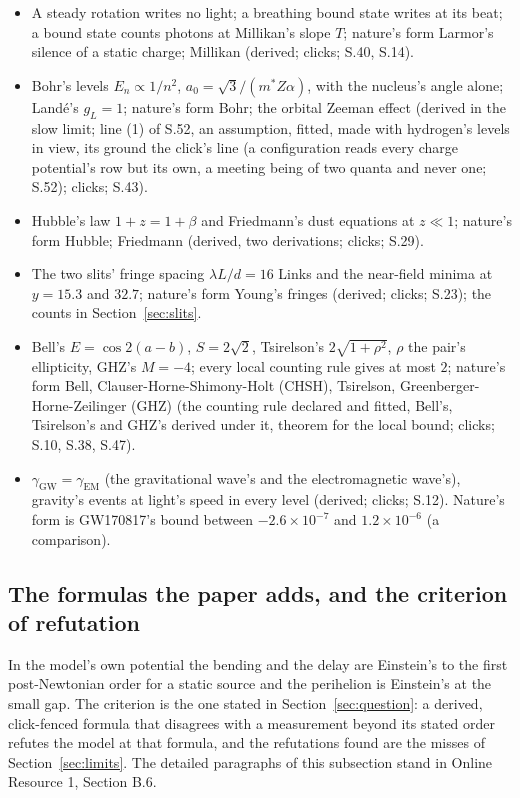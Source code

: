 \documentclass[pdflatex,sn-mathphys-num]{sn-jnl}
\theoremstyle{thmstyleone}
\theoremstyle{thmstyletwo}
\begin{document}
\begin{itemize}[nosep,leftmargin=1.2em]
\item A steady rotation writes no light; a breathing bound state writes at its beat; a bound state counts photons at Millikan's slope $T$; nature's form Larmor's silence of a static charge; Millikan (derived; clicks; S.40, S.14).
\item Bohr's levels $E_n \propto 1 / n^2$, $a_0 = \sqrt 3 / (m^* Z\alpha)$, with the nucleus's angle alone; Land\'e's $g_L = 1$; nature's form Bohr; the orbital Zeeman effect (derived in the slow limit; line (1) of S.52, an assumption, fitted, made with hydrogen's levels in view, its ground the click's line (a configuration reads every charge potential's row but its own, a meeting being of two quanta and never one; S.52); clicks; S.43).
\item Hubble's law $1 + z = 1 + \beta$ and Friedmann's dust equations at $z \ll 1$; nature's form Hubble; Friedmann (derived, two derivations; clicks; S.29).
\item The two slits' fringe spacing $\lambda L / d = 16$ Links and the near-field minima at $y = 15.3$ and $32.7$; nature's form Young's fringes (derived; clicks; S.23); the counts in Section~\ref{sec:slits}.
\item Bell's $E = \cos 2(a - b)$, $S = 2\sqrt 2$, Tsirelson's $2\sqrt{1 + \rho^2}$, $\rho$ the pair's ellipticity, GHZ's $M = -4$; every local counting rule gives at most $2$; nature's form Bell, Clauser-Horne-Shimony-Holt (CHSH), Tsirelson, Greenberger-Horne-Zeilinger (GHZ) \cite{pan} (the counting rule declared and fitted, Bell's, Tsirelson's and GHZ's derived under it, theorem for the local bound; clicks; S.10, S.38, S.47).
\item $\gamma_{\mathrm{GW}} = \gamma_{\mathrm{EM}}$ (the gravitational wave's and the electromagnetic wave's), gravity's events at light's speed in every level (derived; clicks; S.12). Nature's form is GW170817's bound between $-2.6 \times 10^{-7}$ and $1.2 \times 10^{-6}$ \cite{gw170817} (a comparison).
\end{itemize}

\subsection{The formulas the paper adds, and the criterion of refutation}\label{sec:added}

In the model's own potential the bending and the delay are Einstein's to the first post-Newtonian order for a static source and the perihelion is Einstein's at the small gap. The criterion is the one stated in Section~\ref{sec:question}: a derived, click-fenced formula that disagrees with a measurement beyond its stated order refutes the model at that formula, and the refutations found are the misses of Section~\ref{sec:limits}. The detailed paragraphs of this subsection stand in Online Resource 1, Section B.6.
\end{document}
